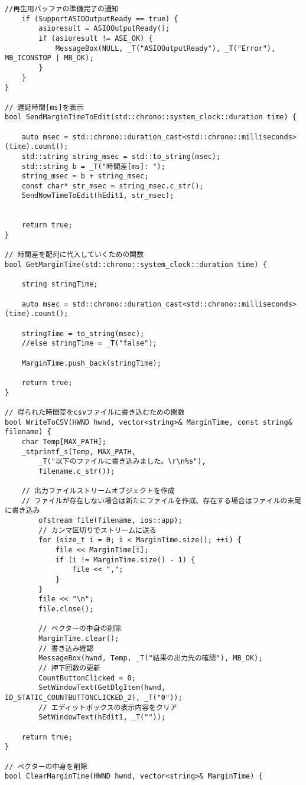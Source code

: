 \begin{lstlisting}[caption=main.cpp]
	//再生用バッファの準備完了の通知
	if (SupportASIOOutputReady == true) {
		asioresult = ASIOOutputReady();
		if (asioresult != ASE_OK) {
			MessageBox(NULL, _T("ASIOOutputReady"), _T("Error"), MB_ICONSTOP | MB_OK);
		}
	}
}

// 遅延時間[ms]を表示
bool SendMarginTimeToEdit(std::chrono::system_clock::duration time) {

	auto msec = std::chrono::duration_cast<std::chrono::milliseconds>(time).count();
	std::string string_msec = std::to_string(msec);
	std::string b = _T("時間差[ms]: ");
	string_msec = b + string_msec;
	const char* str_msec = string_msec.c_str();
	SendNowTimeToEdit(hEdit1, str_msec);
	

	return true;
}

// 時間差を配列に代入していくための関数
bool GetMarginTime(std::chrono::system_clock::duration time) {

	string stringTime;

	auto msec = std::chrono::duration_cast<std::chrono::milliseconds>(time).count();
	
	stringTime = to_string(msec);
	//else stringTime = _T("false"); 

	MarginTime.push_back(stringTime);

	return true;
}

// 得られた時間差をcsvファイルに書き込むための関数
bool WriteToCSV(HWND hwnd, vector<string>& MarginTime, const string& filename) {
	char Temp[MAX_PATH];
	_stprintf_s(Temp, MAX_PATH,
		_T("以下のファイルに書き込みました。\r\n%s"),
		filename.c_str());

	// 出力ファイルストリームオブジェクトを作成
	// ファイルが存在しない場合は新たにファイルを作成、存在する場合はファイルの末尾に書き込み
		ofstream file(filename, ios::app);
		// カンマ区切りでストリームに送る
		for (size_t i = 0; i < MarginTime.size(); ++i) {
			file << MarginTime[i];
			if (i != MarginTime.size() - 1) {
				file << ",";
			}
		}
		file << "\n";
		file.close();

		// ベクターの中身の削除
		MarginTime.clear();
		// 書き込み確認
		MessageBox(hwnd, Temp, _T("結果の出力先の確認"), MB_OK);
		// 押下回数の更新
		CountButtonClicked = 0;
		SetWindowText(GetDlgItem(hwnd, ID_STATIC_COUNTBUTTONCLICKED_2), _T("0"));
		// エディットボックスの表示内容をクリア
		SetWindowText(hEdit1, _T(""));

	return true;
}

// ベクターの中身を削除
bool ClearMarginTime(HWND hwnd, vector<string>& MarginTime) {


\end{lstlisting}
